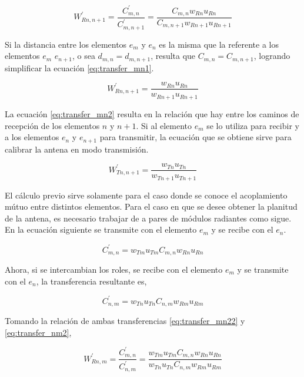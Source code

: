\begin{equation}
	W^{'}_{Rn,n + 1} = \dfrac{C^{'}_{m,n}}{C^{'}_{m,n + 1}} = \dfrac{C_{m,n} w_{Rn} u_{Rn}}{C_{m,n + 1} w_{Rn + 1} u_{Rn + 1}}
	\label{eq:transfer_mn1}
\end{equation}

Si la distancia entre los elementos $e_m$ y $e_n$ es la misma que la referente a los elementos $e_m$ $e_{n+1}$, o sea 
$d_{m,n} = d_{m,n+1}$, resulta que $C_{m,n} = C_{m, n + 1}$, logrando simplificar la ecuación \ref{eq:transfer_mn1}.

\begin{equation}
	W^{'}_{Rn,n + 1} = \dfrac{w_{Rn} u_{Rn}}{w_{Rn + 1} u_{Rn + 1}}
	\label{eq:transfer_mn2}
\end{equation}

La ecuación \ref{eq:transfer_mn2} resulta en la relación que hay entre los caminos de recepción de los elementos $n$ y 
$n+1$. Si al elemento $e_m$ se lo utiliza para recibir y a los elementos $e_n$ y $e_{n + 1}$ para transmitir, la ecuación que se 
obtiene sirve para calibrar la antena en modo transmisión.

\begin{equation}
	W^{'}_{Tn,n + 1} = \dfrac{w_{Tn} u_{Tn}}{w_{Tn + 1} u_{Tn + 1}}
\end{equation}

El cálculo previo sirve solamente para el caso donde se conoce el acoplamiento mútuo entre distintos elementos. Para el caso 
en que se desee obtener la planitud de la antena, es necesario trabajar de a pares de módulos radiantes como sigue. En la 
ecuación siguiente se transmite con el elemento $e_m$ y se recibe con el $e_n$.

\begin{equation}
	C^{'}_{m,n} = w_{Tm} u_{Tm} C_{m,n} w_{Rn} u_{Rn}
	\label{eq:transfer_mn22}
\end{equation}


Ahora, si se intercambian los roles, se recibe con el elemento $e_m$ y se transmite con el $e_n$, la transferencia resultante es,

\begin{equation}
	C^{'}_{n, m} = w_{Tn} u_{Tn} C_{n,m} w_{Rm} u_{Rm}
	\label{eq:transfer_nm2}
\end{equation}

Tomando la relación de ambas transferencias \ref{eq:transfer_mn22} y \ref{eq:transfer_nm2},

\begin{equation}
	W^{'}_{Rn,m} = \dfrac{C^{'}_{m,n}}{C^{'}_{n, m}} = \dfrac{w_{Tm} u_{Tm} C_{m,n} w_{Rn} u_{Rn}}{w_{Tn} u_{Tn} C_{n,m} w_{Rm} u_{Rm}}
	\label{eq:transfer_mn3}
\end{equation}

